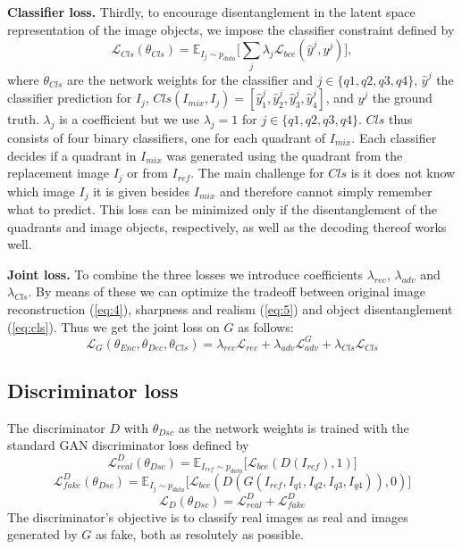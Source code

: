 \documentclass[a4paper,12pt]{report}
\begin{document}
\textbf{Classifier loss.} Thirdly, to encourage disentanglement in the latent space representation of the image objects, we impose the classifier constraint defined by
\begin{equation} \label{eq:cls}
    \mathcal{L}_{Cls}(\theta_{Cls}) = \mathbb{E}_{I_{j}\sim p_{data}}\big[\sum_{j} \lambda_j \mathcal{L}_{bce}(\hat{y}^j, y^j)\big],
\end{equation}
where $\theta_{Cls}$ are the network weights for the classifier and $j \in \{q1,q2,q3,q4\}$, $\hat{y}^j$ the classifier prediction for $I_j$, $Cls(I_{mix}, I_j) = [\hat{y}^j_1, \hat{y}^j_2, \hat{y}^j_3, \hat{y}^j_4]$, and $y^j$ the ground truth. $\lambda_j$ is a coefficient but we use $\lambda_j = 1$  for $j \in \{q1,q2,q3,q4\}$. $Cls$ thus consists of four binary classifiers, one for each quadrant of $I_{mix}$. Each classifier decides if a quadrant in $I_{mix}$ was generated using the quadrant from the replacement image $I_j$ or from $I_{ref}$. The main challenge for $Cls$ is it does not know which image $I_j$ it is given besides $I_{mix}$ and therefore cannot simply remember what to predict. This loss can be minimized only if the disentanglement of the quadrants and image objects, respectively, as well as the decoding thereof works well.

\textbf{Joint loss.} To combine the three losses we introduce coefficients $\lambda_{rec}$, $\lambda_{adv}$ and $\lambda_{Cls}$. By means of these we can optimize the tradeoff between original image reconstruction (\ref{eq:4}), sharpness and realism (\ref{eq:5}) and object disentanglement (\ref{eq:cls}). Thus we get the joint loss on $G$ as follows:
\begin{equation} \label{eq:g_loss_comp}
    \mathcal{L}_{G}(\theta_{Enc},\theta_{Dec},\theta_{Cls}) = \lambda_{rec} \mathcal{L}_{rec} + \lambda_{adv} \mathcal{L}^G_{adv} + \lambda_{Cls} \mathcal{L}_{Cls}
\end{equation}

\subsection{Discriminator loss}
The discriminator $D$ with $\theta_{Dsc}$ as the network weights is trained with the standard GAN discriminator loss defined by
\begin{equation} \label{eq:lorbms_D_real}
    \mathcal{L}^D_{real}(\theta_{Dsc}) = \mathbb{E}_{I_{ref}\sim p_{data}}\big[ \mathcal{L}_{bce}(D(I_{ref}), 1)\big]
\end{equation}
\begin{equation} \label{eq:lorbms_D_fake}
    \mathcal{L}^D_{fake}(\theta_{Dsc}) =  \mathbb{E}_{I_{j}\sim p_{data}}\big[ \mathcal{L}_{bce}(D(G(I_{ref},I_{q1},I_{q2},I_{q3},I_{q4})), 0)\big]
\end{equation}
\begin{equation} \label{eq:lorbms_D}
    \mathcal{L}_{D}(\theta_{Dsc}) = \mathcal{L}^D_{real} + \mathcal{L}^D_{fake}
\end{equation}
The discriminator's objective is to classify real images as real and images generated by $G$ as fake, both as resolutely as possible.
\end{document}

